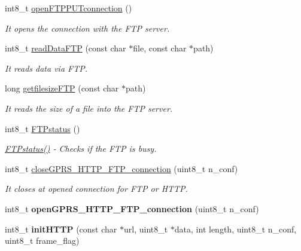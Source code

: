 \begin{DoxyCompactItemize}
int8\+\_\+t \hyperlink{class_wasp_g_p_r_s___pro__core_abf39b04f5d110f82c23c81468d42397b}{open\+F\+T\+P\+P\+U\+Tconnection} ()
\begin{DoxyCompactList}\small\item\em It opens the connection with the F\+TP server. \end{DoxyCompactList}\item 
int8\+\_\+t \hyperlink{class_wasp_g_p_r_s___pro__core_a76d831196c7f3221bf3a2301212397f1}{read\+Data\+F\+TP} (const char $\ast$file, const char $\ast$path)
\begin{DoxyCompactList}\small\item\em It reads data via F\+TP. \end{DoxyCompactList}\item 
long \hyperlink{class_wasp_g_p_r_s___pro__core_a9f97f2c31c895adabdc35dd7d5f4b0c8}{getfilesize\+F\+TP} (const char $\ast$path)
\begin{DoxyCompactList}\small\item\em It reads the size of a file into the F\+TP server. \end{DoxyCompactList}\item 
int8\+\_\+t \hyperlink{class_wasp_g_p_r_s___pro__core_af53ee6dec09dccc5c2ec0831ae8e7d71}{F\+T\+Pstatus} ()
\begin{DoxyCompactList}\small\item\em \hyperlink{class_wasp_g_p_r_s___pro__core_af53ee6dec09dccc5c2ec0831ae8e7d71}{F\+T\+Pstatus()} -\/ Checks if the F\+TP is busy. \end{DoxyCompactList}\item 
int8\+\_\+t \hyperlink{class_wasp_g_p_r_s___pro__core_a4612da214868a0a0b5024f8c99bd9b7a}{close\+G\+P\+R\+S\+\_\+\+H\+T\+T\+P\+\_\+\+F\+T\+P\+\_\+connection} (uint8\+\_\+t n\+\_\+conf)
\begin{DoxyCompactList}\small\item\em It closes at opened connection for F\+TP or H\+T\+TP. \end{DoxyCompactList}\item 
int8\+\_\+t {\bfseries open\+G\+P\+R\+S\+\_\+\+H\+T\+T\+P\+\_\+\+F\+T\+P\+\_\+connection} (uint8\+\_\+t n\+\_\+conf)\hypertarget{class_wasp_g_p_r_s___pro__core_a380641da3c2e5547d57b7e452ff795df}{}\label{class_wasp_g_p_r_s___pro__core_a380641da3c2e5547d57b7e452ff795df}

\item 
int8\+\_\+t {\bfseries init\+H\+T\+TP} (const char $\ast$url, uint8\+\_\+t $\ast$data, int length, uint8\+\_\+t n\+\_\+conf, uint8\+\_\+t frame\+\_\+flag)\hypertarget{class_wasp_g_p_r_s___pro__core_adf3439e76e9ca9887b37da080cd96860}{}\label{class_wasp_g_p_r_s___pro__core_adf3439e76e9ca9887b37da080cd96860}


\end{DoxyCompactItemize}

